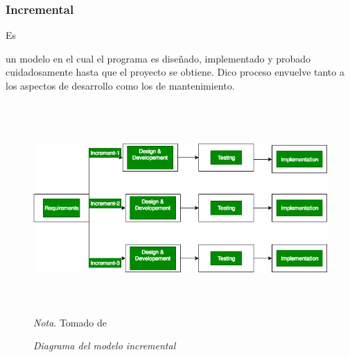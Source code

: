 \documentclass[stu, 12pt, letterpaper, donotrepeattitle, floatsintext, natbib]{apa7}
\begin{document}
\subsubsection{Incremental}
Es \begin{justifying}
    un modelo en el cual el programa es diseñado, implementado y probado cuidadosamente hasta que el proyecto se obtiene. Dico proceso envuelve tanto a los aspectos de desarrollo como
los de mantenimiento.\par
\end{justifying}
\begin{figure}[H]
    \caption{\emph{Diagrama del modelo incremental\\}}
    \centering
    \smallskip
    \includegraphics[width=12cm, height=8cm]{incremental.png}
    \bigskip
    \justifying\small\textit{Nota}. Tomado de \cite{geeksforgeeks-2019}%
\end{figure}
\vspace{\baselineskip}
\end{document}
